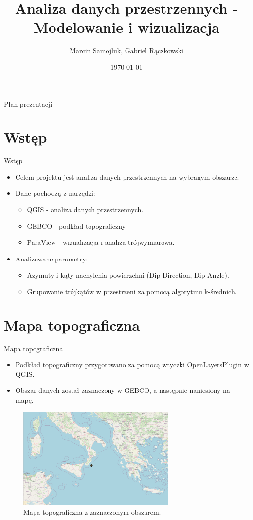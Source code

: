 \documentclass{beamer}
\title{Analiza danych przestrzennych - Modelowanie i wizualizacja}
\author{Marcin Samojluk, Gabriel Rączkowski}
\date{\today}
\begin{document}
\frame{\titlepage}

\begin{frame}{Plan prezentacji}
    \tableofcontents
\end{frame}

\section{Wstęp}
\begin{frame}{Wstęp}
    \begin{itemize}
        \item Celem projektu jest analiza danych przestrzennych na wybranym obszarze.
        \item Dane pochodzą z narzędzi:
        \begin{itemize}
            \item QGIS - analiza danych przestrzennych.
            \item GEBCO - podkład topograficzny.
            \item ParaView - wizualizacja i analiza trójwymiarowa.
        \end{itemize}
        \item Analizowane parametry:
        \begin{itemize}
            \item Azymuty i kąty nachylenia powierzchni (Dip Direction, Dip Angle).
            \item Grupowanie trójkątów w przestrzeni za pomocą algorytmu k-średnich.
        \end{itemize}
    \end{itemize}
\end{frame}

\section{Mapa topograficzna}
\begin{frame}{Mapa topograficzna}
    \begin{itemize}
        \item Podkład topograficzny przygotowano za pomocą wtyczki OpenLayersPlugin w QGIS.
        \item Obszar danych został zaznaczony w GEBCO, a następnie naniesiony na mapę.
    \end{itemize}
    \begin{figure}
        \includegraphics[width=0.7\textwidth]{topograf.png}
        \caption{Mapa topograficzna z zaznaczonym obszarem.}
    \end{figure}
\end{frame}
\end{document}

